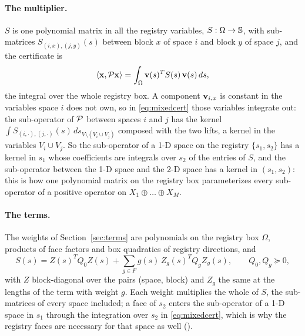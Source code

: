 \paragraph{The multiplier.} $S$ is one polynomial matrix in all the registry variables, $S:\Omega\to\mathbb{S}$, with sub-matrices $S_{(i,x),(j,y)}(s)$ between block $x$ of space $i$ and block $y$ of space $j$, and the certificate is
\begin{equation}\label{eq:mixedcert}
\left\langle \mathbf{x},\mathcal{P}\mathbf{x}\right\rangle=\int_\Omega\mathbf{v}(s)^TS(s)\,\mathbf{v}(s)\,ds,
\end{equation}
the integral over the whole registry box. A component $\mathbf{v}_{i,x}$ is constant in the variables space $i$ does not own, so in \eqref{eq:mixedcert} those variables integrate out: the sub-operator of $\mathcal{P}$ between spaces $i$ and $j$ has the kernel $\int S_{(i,\cdot),(j,\cdot)}(s)\,ds_{V\setminus(V_i\cup V_j)}$ composed with the two lifts, a kernel in the variables $V_i\cup V_j$. So the sub-operator of a 1-D space on the registry $\{s_1,s_2\}$ has a kernel in $s_1$ whose coefficients are integrals over $s_2$ of the entries of $S$, and the sub-operator between the 1-D space and the 2-D space has a kernel in $(s_1,s_2)$: this is how one polynomial matrix on the registry box parameterizes every sub-operator of a positive operator on $X_1\oplus\dots\oplus X_M$.

\paragraph{The terms.} The weights of Section~\ref{sec:terms} are polynomials on the registry box $\Omega$, products of face factors and box quadratics of registry directions, and
\begin{equation}\label{eq:mixedS}
S(s)=Z(s)^TQ_0Z(s)+\sum_{g\in F}g(s)\,Z_g(s)^TQ_gZ_g(s),\qquad Q_0,Q_g\succeq0,
\end{equation}
with $Z$ block-diagonal over the pairs (space, block) and $Z_g$ the same at the lengths of the term with weight $g$. Each weight multiplies the whole of $S$, the sub-matrices of every space included; a face of $s_2$ enters the sub-operator of a 1-D space in $s_1$ through the integration over $s_2$ in \eqref{eq:mixedcert}, which is why the registry faces are necessary for that space as well (\liftref).

